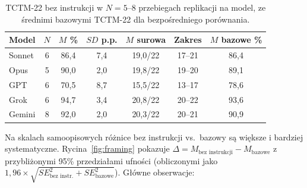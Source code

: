 \documentclass[11pt,a4paper]{article}
\begin{document}
\begin{table}[htbp]\centering\footnotesize
\caption{TCTM-22 bez instrukcji w $N = 5$--$8$ przebiegach replikacji na model, ze średnimi bazowymi TCTM-22 dla bezpośredniego porównania.}
\label{tab:noprompt-tctm}
\begin{tabular}{lcccccc}
\toprule
\textbf{Model} & $N$ & $M$ \% & $SD$ p.p. & $M$ surowa & Zakres & $M$ bazowe \% \\
\midrule
Sonnet & 6 & 86,4 & 7,4 & 19,0/22 & 17--21 & 86,4 \\
Opus & 5 & 90,0 & 2,0 & 19,8/22 & 19--20 & 89,1 \\
GPT & 6 & 70,5 & 8,7 & 15,5/22 & 13--17 & 78,6 \\
Grok & 6 & 94,7 & 3,4 & 20,8/22 & 20--22 & 93,6 \\
Gemini & 8 & 92,0 & 2,0 & 20,3/22 & 20--21 & 90,9 \\
\bottomrule
\end{tabular}
\end{table}

Na skalach samoopisowych różnice bez instrukcji vs.\ bazowy są większe i bardziej systematyczne. Rycina~\ref{fig:framing} pokazuje $\Delta = M_{\text{bez instrukcji}} - M_{\text{bazowe}}$ z przybliżonymi 95\% przedziałami ufności (obliczonymi jako $1{,}96 \times \sqrt{SE_{\text{bez instr.}}^2 + SE_{\text{bazowe}}^2}$). Główne obserwacje:
\end{document}
